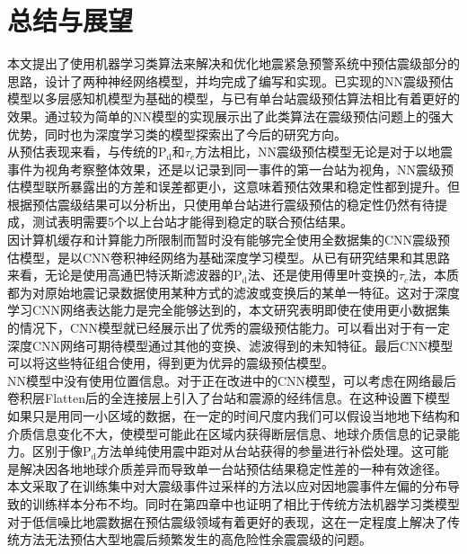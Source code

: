 \chapter{总结与展望}
\indent 本文提出了使用机器学习类算法来解决和优化地震紧急预警系统中预估震级部分的思路，设计了两种神经网络模型，并均完成了编写和实现。已实现的NN震级预估模型以多层感知机模型为基础的模型，与已有单台站震级预估算法相比有着更好的效果。通过较为简单的NN模型的实现展示出了此类算法在震级预估问题上的强大优势，同时也为深度学习类的模型探索出了今后的研究方向。\\
\indent 从预估表现来看，与传统的$\mathrm{P}_{\mathrm{d}}$和$\tau_{c}$方法相比，NN震级预估模型无论是对于以地震事件为视角考察整体效果，还是以记录到同一事件的第一台站为视角，NN震级预估模型联所暴露出的方差和误差都更小，这意味着预估效果和稳定性都到提升。但根据预估震级结果可以分析出，只使用单台站进行震级预估的稳定性仍然有待提成，测试表明需要5个以上台站才能得到稳定的联合预估结果。\\
\indent 因计算机缓存和计算能力所限制而暂时没有能够完全使用全数据集的CNN震级预估模型，是以CNN卷积神经网络为基础深度学习模型。从已有研究结果和其思路来看，无论是使用高通巴特沃斯滤波器的$\mathrm{P}_{\mathrm{d}}$法、还是使用傅里叶变换的$\tau_{c}$法，本质都为对原始地震记录数据使用某种方式的滤波或变换后的某单一特征。这对于深度学习CNN网络表达能力是完全能够达到的，本文研究表明即使在使用更小数据集的情况下，CNN模型就已经展示出了优秀的震级预估能力。可以看出对于有一定深度CNN网络可期待模型通过其他的变换、滤波得到的未知特征。最后CNN模型可以将这些特征组合使用，得到更为优异的震级预估模型。\\
\indent NN模型中没有使用位置信息。对于正在改进中的CNN模型，可以考虑在网络最后卷积层Flatten后的全连接层上引入了台站和震源的经纬信息。在这种设置下模型如果只是用同一小区域的数据，在一定的时间尺度内我们可以假设当地地下结构和介质信息变化不大，使模型可能此在区域内获得断层信息、地球介质信息的记录能力。区别于像$\mathrm{P}_{\mathrm{d}}$方法单纯使用震中距对从台站获得的参量进行补偿处理。这可能是解决因各地地球介质差异而导致单一台站预估结果稳定性差的一种有效途径。\\
\indent 本文采取了在训练集中对大震级事件过采样的方法以应对因地震事件左偏的分布导致的训练样本分布不均。同时在第四章中也证明了相比于传统方法机器学习类模型对于低信噪比地震数据在预估震级领域有着更好的表现，这在一定程度上解决了传统方法无法预估大型地震后频繁发生的高危险性余震震级的问题。\\